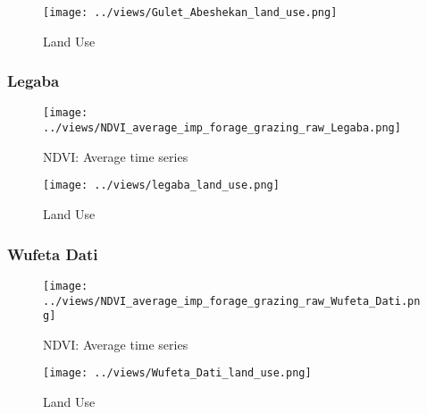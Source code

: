 \documentclass[10pt,a4paper,onecolumn]{article}
\begin{document}
\begin{figure}[H] \centering
  \captionsetup{justification=centering}
\caption{Land Use} 
\centering


\texttt{[image: ../views/Gulet\_Abeshekan\_land\_use.png]}

\end{figure}




\pagebreak


\subsubsection{Legaba}
\begin{figure}[H] \centering
  \captionsetup{justification=centering}
\caption{NDVI: Average time series } 
\centering


\texttt{[image: ../views/NDVI\_average\_imp\_forage\_grazing\_raw\_Legaba.png]}

\end{figure}

\begin{figure}[H] \centering
  \captionsetup{justification=centering}
\caption{Land Use} 
\centering


\texttt{[image: ../views/legaba\_land\_use.png]}

\end{figure}



\pagebreak


\subsubsection{Wufeta Dati}
\begin{figure}[H] \centering
  \captionsetup{justification=centering}
\caption{NDVI: Average time series } 
\centering


\texttt{[image: ../views/NDVI\_average\_imp\_forage\_grazing\_raw\_Wufeta\_Dati.png]}

\end{figure}


\begin{figure}[H] \centering
  \captionsetup{justification=centering}
\caption{Land Use} 
\centering


\texttt{[image: ../views/Wufeta\_Dati\_land\_use.png]}

\end{figure}
\end{document}
